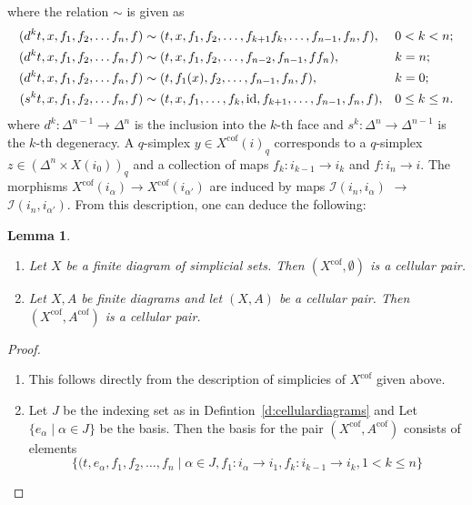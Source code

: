 \documentclass[12pt,a4wide]{article}
\theoremstyle{plain}
\newtheorem{lemma}[thm]{Lemma}
\theoremstyle{definition}
\newcommand{\cofr}{\mathrm{cof}}
\newcommand{\thedimm}{{k}}
\newcommand{\stdsimp}[1]{\Delta^{#1}}
\renewcommand\:{\colon}
\newcommand{\dX}{X}
\newcommand{\icat}{\mathcal I}
\begin{document}
where the relation $\sim$ is given as 
\begin{align*}
(d^k t, x, f_1, f_2, \ldots f_n, f) \sim {} & (t, x, f_1, f_2, \ldots ,f_{k+1}  f_{k}  , \ldots, f_{n-1}, f_n, f),  & & 0< k< n; \\
(d^k t, x, f_1, f_2, \ldots f_{n}, f) \sim {} & (t, x, f_1, f_2, \ldots, f_{n-2}, f_{n-1}, f f_n), & & k= {n};\\
(d^k t, x, f_1, f_2, \ldots f_{n}, f)\sim {} & (t, f_1(x), f_2,  \ldots , f_{n-1}, f_{n}, f),  &  &k= 0;\\
(s^{k}t, x, f_1, f_2, \ldots f_{n}, f)\sim {} & ( t, x, f_1,  \ldots, f_{k}, \mathop\mathrm{id}\nolimits , f_{k+1},\ldots, f_{n-1}, f_{n}, f),  &  & 0\leq k\leq n.
\end{align*}
where $d^k\colon \stdsimp{n-1} \to \stdsimp{n}$ is the inclusion into the $k$-th face and $s^k\:\stdsimp{n} \to \stdsimp{n-1}$ is the $k$-th degeneracy.
A $q$-simplex $y \in \dX^\cofr (i) _q$ corresponds to a $q$-simplex $z \in (\stdsimp{n} \times \dX(i_0))_q$ and a collection of maps $f_\thedimm \: i_{\thedimm-1} \to i_{\thedimm}$ and $f\: i_n \to i$. The morphisms $\dX^{\cofr} (i_\alpha) \to \dX^{\cofr} (i_{\alpha'})$ are induced by maps $\icat( i_n, i_\alpha)$ $\to$ $\icat(i_n, i_{\alpha'})$. From this description, one can deduce the following:
\begin{lemma}\hfill
\begin{enumerate}
\item Let $X$ be a finite diagram of simplicial sets. Then $(X^\cofr, \emptyset)$ is a cellular pair.
\item Let $X,A$ be finite diagrams and let $(X,A)$ be a cellular pair. Then $(X^\cofr, A^\cofr)$ is a cellular pair.
\end{enumerate}
\end{lemma}
\begin{proof}\hfill
\begin{enumerate}
\item This follows directly from the description of simplicies of $X^\cofr$ given above.

\item Let $J$ be the indexing set as in Defintion~\ref{d:cellulardiagrams} and Let $\{e_\alpha \mid \alpha \in J \}$ be the basis. Then the basis for the pair $(X^\cofr, A^\cofr)$ consists of elements 
\[
\{(t, e_\alpha,f_1,f_2,\ldots, f_n \mid \alpha \in J, f_1\: i_\alpha \to i_1, f_k\:i_{k-1} \to i_{k}, 1<k\leq n \}
\]
\end{enumerate}
\end{proof}
\end{document}
